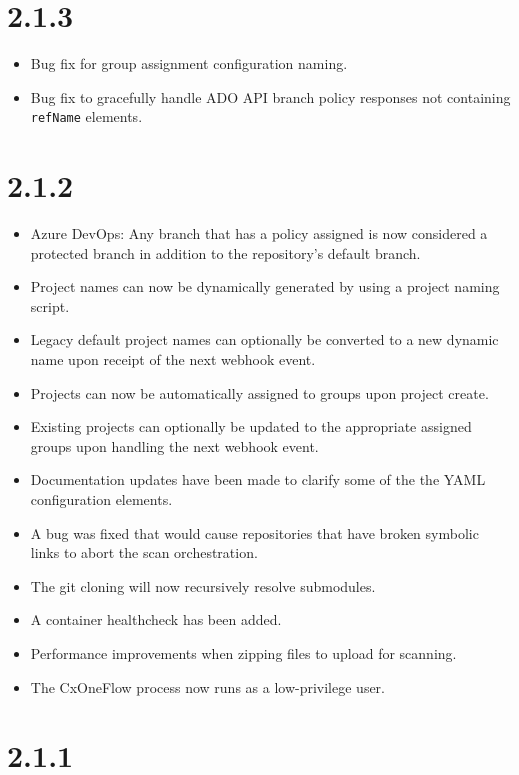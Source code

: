 \section{2.1.3}

\begin{itemize}
    \item Bug fix for group assignment configuration naming.
    \item Bug fix to gracefully handle ADO API branch policy responses not containing \texttt{refName} elements.
\end{itemize}

\section{2.1.2}

\begin{itemize}
    \item Azure DevOps: Any branch that has a policy assigned is now considered
    a protected branch in addition to the repository's default branch.
    \item Project names can now be dynamically generated by using a project naming script.
    \item Legacy default project names can optionally be converted to a new dynamic name
    upon receipt of the next webhook event.
    \item Projects can now be automatically assigned to groups upon project create.
    \item Existing projects can optionally be updated to the appropriate assigned groups upon handling
    the next webhook event.
    \item Documentation updates have been made to clarify some of the the YAML configuration elements.
    \item A bug was fixed that would cause repositories that have broken symbolic links to abort the scan orchestration.
    \item The git cloning will now recursively resolve submodules.
    \item A container healthcheck has been added.
    \item Performance improvements when zipping files to upload for scanning.
    \item The CxOneFlow process now runs as a low-privilege user.
\end{itemize}

\section{2.1.1}

